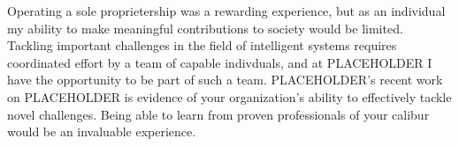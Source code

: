\begin{cvletter}

	Operating a sole proprietership was a rewarding experience, but as
	an individual my ability to make meaningful contributions to society
	would be limited. Tackling important challenges in the field of
	intelligent systems requires coordinated effort by a team of
	capable indivduals, and at PLACEHOLDER I have the opportunity to be
	part of such a team. PLACEHOLDER's recent work on PLACEHOLDER is
	evidence of your organization's ability to effectively tackle novel
	challenges. Being able to learn from proven professionals of your
	calibur would be an invaluable experience.

\end{cvletter}
